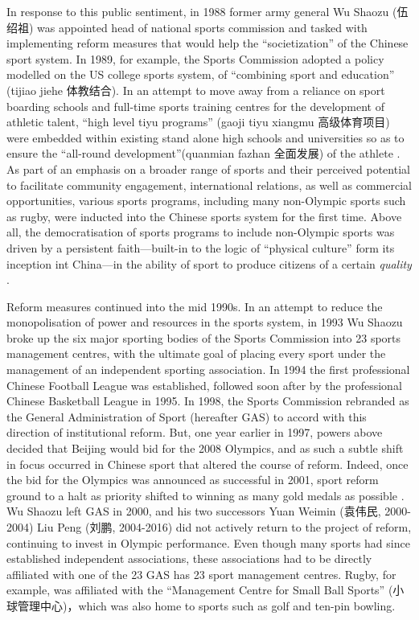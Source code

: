 In response to this public sentiment, in 1988 former army general Wu Shaozu (伍绍祖) was
appointed head of national sports commission and tasked with implementing reform measures that would help the ``societization'' of the Chinese sport system. In 1989, for example, the Sports Commission adopted a policy modelled on the US college sports system, of ``combining sport and education'' (tijiao jiehe 体教结合).  In an attempt to move away from a reliance on sport boarding schools and full-time sports training centres for the development of athletic talent, ``high level tiyu programs'' (gaoji tiyu xiangmu 高级体育项目) were embedded within existing stand alone high schools and universities so as to ensure the ``all-round development''(quanmian fazhan 全面发展) of the athlete \citep[203]{Brownell1995}.  As part of an emphasis on a broader range of sports and their perceived potential to facilitate community engagement, international relations, as well as commercial opportunities, various sports programs, including many non-Olympic sports such as rugby, were inducted into the Chinese sports system for the first time\citep[70]{Knuttgen1990}.  Above all, the  democratisation of sports programs to include non-Olympic sports was driven by a persistent faith---built-in to the logic of ``physical culture'' form its inception int China---in the ability of sport to produce citizens of a certain \textit{quality} \citep[7]{Woronov2003}.


Reform measures continued into the mid 1990s. In an attempt to reduce the monopolisation of power and resources in the sports system, in 1993 Wu Shaozu broke up the six major sporting bodies of the Sports Commission into 23 sports management centres, with the ultimate goal of placing every sport under the management of an independent sporting association. In 1994 the first professional Chinese Football League was established, followed soon after by the professional Chinese Basketball League in 1995. In 1998, the Sports Commission rebranded as the General Administration of Sport (hereafter GAS) to accord with this direction of institutional reform.  But, one year earlier in 1997, powers above decided that Beijing would bid for the 2008 Olympics, and as such a subtle shift in focus occurred in Chinese sport that altered the course of reform.  Indeed, once the bid for the Olympics was announced as successful in 2001, sport reform ground to a halt as priority shifted to winning as many gold medals as possible \citep{News2017}.  Wu Shaozu left GAS in 2000, and his two successors Yuan Weimin (袁伟民, 2000-2004) Liu Peng
(刘鹏, 2004-2016) did not actively return to the project of reform, continuing to invest in Olympic performance.  Even though many sports had since established independent associations, these associations had to be directly affiliated with one of the 23 GAS has 23 sport management centres. Rugby, for example, was affiliated with the ``Management Centre for Small Ball Sports'' (小球管理中心)，which was also home to sports such as golf and ten-pin bowling.

